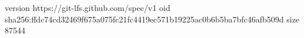 version https://git-lfs.github.com/spec/v1
oid sha256:ffdc74cd32469f675a075fc21fc4419ec571b19225ac0b6b5ba7bfc46afb509d
size 87544
